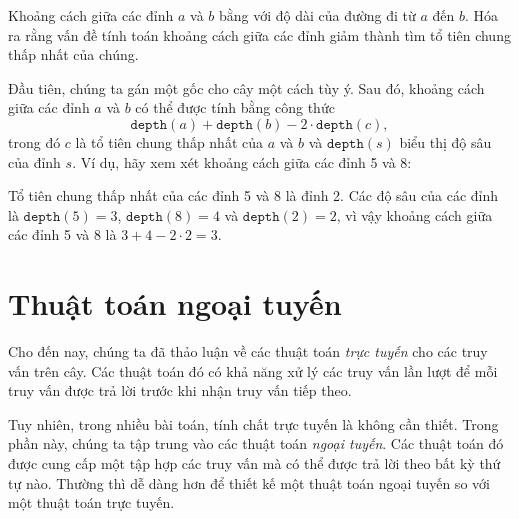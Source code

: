 Khoảng cách giữa các đỉnh $a$ và $b$
bằng với độ dài của đường đi từ $a$ đến $b$.
Hóa ra rằng vấn đề tính toán
khoảng cách giữa các đỉnh giảm thành
tìm tổ tiên chung thấp nhất của chúng.

Đầu tiên, chúng ta gán một gốc cho cây một cách tùy ý.
Sau đó, khoảng cách giữa các đỉnh $a$ và $b$
có thể được tính bằng công thức
\[\texttt{depth}(a)+\texttt{depth}(b)-2 \cdot \texttt{depth}(c),\]
trong đó $c$ là tổ tiên chung thấp nhất của $a$ và $b$
và $\texttt{depth}(s)$ biểu thị độ sâu của đỉnh $s$.
Ví dụ, hãy xem xét khoảng cách giữa các đỉnh 5 và 8:
\begin{center}
\end{center}

Tổ tiên chung thấp nhất của các đỉnh 5 và 8 là đỉnh 2.
Các độ sâu của các đỉnh là
$\texttt{depth}(5)=3$, $\texttt{depth}(8)=4$ và $\texttt{depth}(2)=2$,
vì vậy khoảng cách giữa các đỉnh 5 và 8 là
$3+4-2\cdot2=3$.

\section{Thuật toán ngoại tuyến}


Cho đến nay, chúng ta đã thảo luận về các thuật toán \emph{trực tuyến}
cho các truy vấn trên cây.
Các thuật toán đó có khả năng xử lý
các truy vấn lần lượt để
mỗi truy vấn được trả lời trước khi nhận truy vấn tiếp theo.

Tuy nhiên, trong nhiều bài toán, tính chất trực tuyến
là không cần thiết.
Trong phần này, chúng ta tập trung vào các thuật toán \emph{ngoại tuyến}.
Các thuật toán đó được cung cấp một tập hợp các truy vấn mà có thể
được trả lời theo bất kỳ thứ tự nào.
Thường thì dễ dàng hơn để thiết kế một thuật toán ngoại tuyến
so với một thuật toán trực tuyến.


